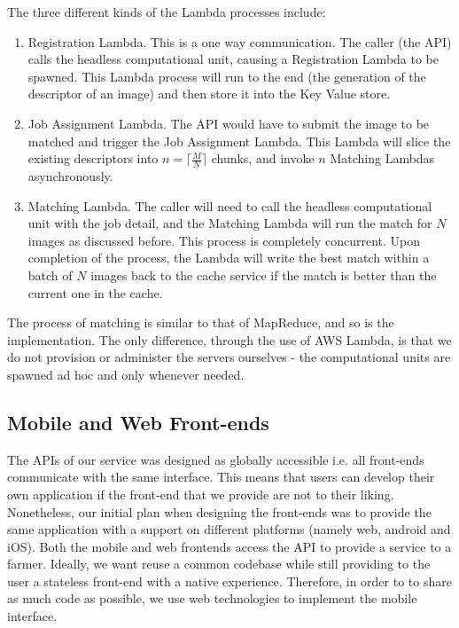 The three different kinds of the Lambda processes include:

\begin{enumerate}
	\item Registration Lambda. This is a one way communication. The caller (the API) calls the headless computational unit, causing a Registration Lambda to be spawned. This Lambda process will run to the end (the generation of the descriptor of an image) and then store it into the Key Value store.
	\item Job Assignment Lambda. The API would have to submit the image to be matched and trigger the Job Assignment Lambda. This Lambda will slice the existing descriptors into $n=\lceil \frac{M}{N} \rceil$ chunks, and invoke $n$ Matching Lambdas asynchronously.
	\item Matching Lambda. The caller will need to call the headless computational unit with the job detail, and the Matching Lambda will run the match for $N$ images as discussed before. This process is completely concurrent. Upon completion of the process, the Lambda will write the best match within a batch of $N$ images back to the cache service if the match is better than the current one in the cache.
\end{enumerate}

The process of matching is similar to that of MapReduce, and so is the implementation. The only difference, through the use of AWS Lambda, is that we do not provision or administer the servers ourselves - the computational units are spawned ad hoc and only whenever needed.

\subsection{Mobile and Web Front-ends}

The APIs of our service was designed as globally accessible i.e. all front-ends communicate with the same interface. This means that users can develop their own application if the front-end that we provide are not to their liking. Nonetheless, our initial plan when designing the front-ends was to provide the same application with a support on different platforms (namely web, android and  iOS). Both the mobile and web frontends access the API to provide a service to a farmer. Ideally, we want reuse a common codebase while still providing to the user a stateless front-end with a native experience. Therefore, in order to to share as much code as possible, we use web technologies to implement the mobile interface.

